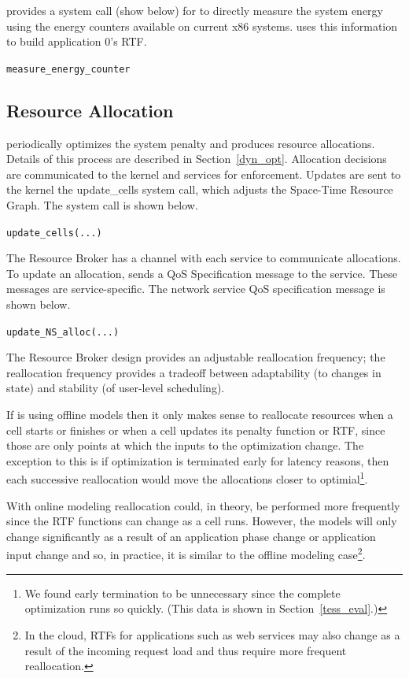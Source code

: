 \tess provides a system call (show below) for \pacora to directly measure the system energy using the energy counters available on current x86 systems.  \pacora uses this information to build application 0's RTF.

\texttt{measure\_energy\_counter}


\subsection{Resource Allocation}
\pacora periodically optimizes the system penalty and produces resource allocations.  Details of this process are described in Section~\ref{dyn_opt}.  Allocation decisions are communicated to the kernel and services for enforcement.  Updates are sent to the kernel the update\_cells system call, which adjusts the Space-Time Resource Graph.  The system call is shown below.

\texttt{update\_cells(...)}

The Resource Broker has a channel with each service to communicate allocations.  To update an allocation, \pacora sends a QoS Specification message to the service.  These messages are service-specific.  The network service QoS specification message is shown below.

\texttt{update\_NS\_alloc(...)}

The Resource Broker design provides an adjustable reallocation frequency; the reallocation frequency provides a tradeoff
between adaptability (to changes in state) and stability (of user-level
scheduling).  

If \pacora is using offline models then it only makes sense to reallocate resources when a cell starts or finishes or when a cell updates its penalty function or RTF, since those are only points at which the inputs to the optimization change.  The exception to this is if optimization is terminated early for latency reasons, then each successive reallocation would move the allocations closer to optimial\footnote{We found early termination to be unnecessary since the complete optimization runs so quickly.  (This data is shown in Section~\ref{tess_eval}.)}. 

With online modeling reallocation could, in theory, be performed more frequently since the RTF functions can change as a cell runs.  However, the models will only change significantly as a result of an application phase change or application input change and so, in practice, it is similar to the offline modeling case\footnote{In the cloud, RTFs for applications such as web services may also change as a result of the incoming request load and thus require more frequent reallocation.}.

